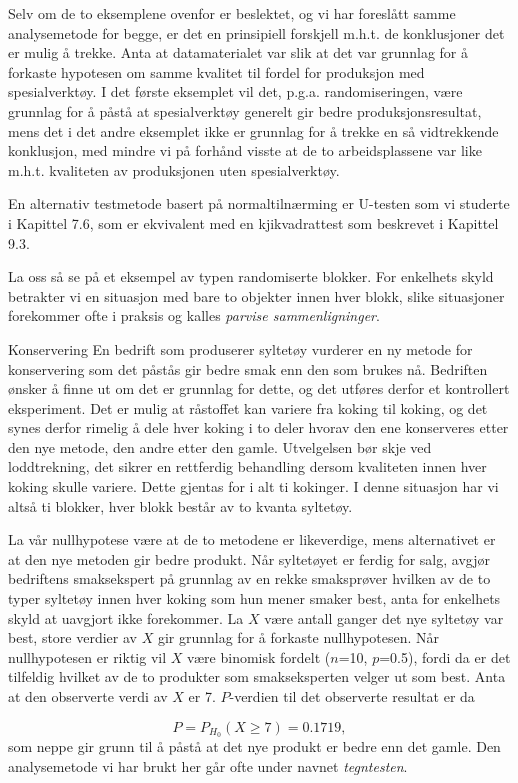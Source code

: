 Selv om de to eksemplene ovenfor er beslektet, og vi har foreslått
samme analysemetode for begge, er det en prinsipiell forskjell m.h.t. 
de konklusjoner det er mulig å trekke.  Anta at datamaterialet 
var slik at det var grunnlag for å forkaste hypotesen om samme
kvalitet til fordel for produksjon med spesialverktøy.  I det
første eksemplet vil det, p.g.a. randomiseringen, være grunnlag
for å påstå at spesialverktøy generelt gir bedre
produksjonsresultat, mens det i det andre eksemplet ikke er grunnlag 
for å trekke en så vidtrekkende konklusjon, med mindre vi på
forhånd visste at de to arbeidsplassene var like m.h.t. kvaliteten
av produksjonen uten spesialverktøy.  

En alternativ testmetode basert på normaltilnærming er U-testen som
vi studerte i Kapittel 7.6, som er ekvivalent med en kjikvadrattest som 
beskrevet i Kapittel 9.3.

La oss så se på et eksempel av typen randomiserte blokker.  
For enkelhets skyld betrakter vi en situasjon med bare to objekter
innen hver blokk, slike situasjoner forekommer ofte i praksis og kalles
{\em parvise sammenligninger}.\\


\begin{eksempel}{Konservering}
En bedrift som produserer syltetøy vurderer en ny metode for 
konservering som det påstås gir bedre smak enn den som brukes 
nå.  Bedriften ønsker å finne ut om det er grunnlag for dette, 
og det utføres derfor et kontrollert eksperiment.  Det er mulig at
råstoffet kan variere fra koking til koking, og det synes derfor
rimelig å dele hver koking i to deler hvorav den ene konserveres
etter den nye metode, den andre etter den gamle.  Utvelgelsen bør
skje ved loddtrekning, det sikrer en rettferdig behandling dersom
kvaliteten innen hver koking skulle variere.  Dette gjentas for i alt 
ti kokinger.  I denne situasjon har vi altså ti blokker, hver 
blokk består av to kvanta syltetøy.

  La vår nullhypotese
være at de to metodene er likeverdige, mens alternativet er at
den nye metoden gir bedre produkt.  Når syltetøyet er ferdig for
salg, avgjør bedriftens smaksekspert på grunnlag av en rekke
smaksprøver hvilken av de to typer syltetøy innen hver koking som
hun mener smaker best, anta for enkelhets skyld at uavgjort ikke 
forekommer.  La $X$ være antall ganger det nye syltetøy var
best, store verdier av $X$ gir grunnlag for å forkaste nullhypotesen.
Når nullhypotesen er riktig vil $X$ være binomisk fordelt
($n$=10, $p$=0.5), fordi da er det tilfeldig hvilket av de to produkter
som smakseksperten velger ut som best.  Anta at den observerte verdi
av $X$ er 7.  $P$-verdien til det observerte resultat er da 

\[ P=P_{H_0}(X\geq 7)=0.1719,          \]
som neppe gir grunn til å påstå at det nye produkt er 
bedre enn det gamle.  Den analysemetode vi har brukt her går ofte 
under navnet {\em tegntesten}.
\end{eksempel}

